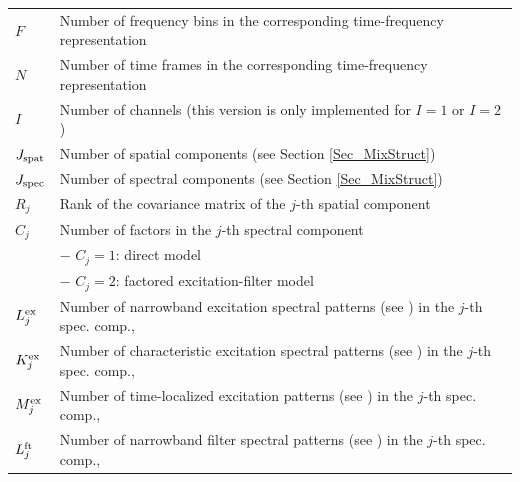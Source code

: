 \documentclass{article}
\begin{document}
\begin{tabular}{ll}
$F$ & Number of frequency bins in the corresponding time-frequency representation \\

$N$ & Number of time frames in the corresponding time-frequency representation \\

$I$ & Number of channels (this version is only implemented for $I = 1$ or $I = 2$) \\

$J_{\rm spat}$ & Number of spatial components (see Section \ref{Sec_MixStruct})\\

$J_{\rm spec}$ & Number of spectral components (see Section \ref{Sec_MixStruct})\\

$R_j$ & Rank of the covariance matrix of the $j$-th spatial component  \\

$C_j$ & Number of factors in the $j$-th spectral component \\
      &  $-$ $C_j = 1$: direct model \\
      &  $-$ $C_j = 2$: factored excitation-filter model \\

$L^{\rm ex}_j$ & Number of narrowband excitation spectral patterns (see \cite{Ozerov2010a}) in the $j$-th spec. comp., \\

$K^{\rm ex}_j$ & Number of characteristic excitation spectral patterns (see \cite{Ozerov2010a}) in the $j$-th spec. comp., \\

$M^{\rm ex}_j$ & Number of time-localized excitation patterns (see \cite{Ozerov2010a}) in the $j$-th spec. comp., \\

$L^{\rm ft}_j$ & Number of narrowband filter spectral patterns (see \cite{Ozerov2010a}) in the $j$-th spec. comp., \\


\end{tabular}
\end{document}
